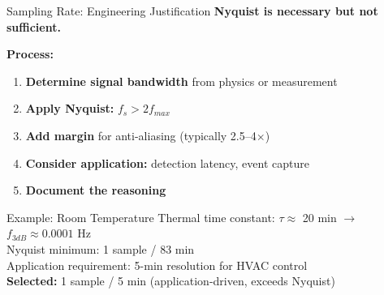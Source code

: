 \documentclass[aspectratio=169,11pt]{beamer}
\begin{document}
\begin{frame}{Sampling Rate: Engineering Justification}
    \textbf{Nyquist is necessary but not sufficient.}
    
    \vspace{0.3cm}
    \textbf{Process:}
    \begin{enumerate}
        \item \textbf{Determine signal bandwidth} from physics or measurement
        \item \textbf{Apply Nyquist:} $f_s > 2 f_{max}$
        \item \textbf{Add margin} for anti-aliasing (typically 2.5--4$\times$)
        \item \textbf{Consider application:} detection latency, event capture
        \item \textbf{Document the reasoning}
    \end{enumerate}
    
    \vspace{0.3cm}
    \begin{exampleblock}{Example: Room Temperature}
        Thermal time constant: $\tau \approx$ 20 min $\rightarrow$ $f_{3dB} \approx 0.0001$ Hz\\
        Nyquist minimum: 1 sample / 83 min\\
        Application requirement: 5-min resolution for HVAC control\\
        \textbf{Selected:} 1 sample / 5 min (application-driven, exceeds Nyquist)
    \end{exampleblock}
\end{frame}
\end{document}
